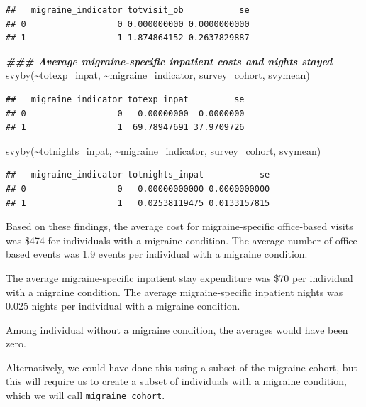 \documentclass[
]{book}
\newenvironment{Shaded}{\begin{snugshade}}{\end{snugshade}}
\newcommand{\DocumentationTok}[1]{\textcolor[rgb]{0.56,0.35,0.01}{\textbf{\textit{#1}}}}
\newcommand{\FunctionTok}[1]{\textcolor[rgb]{0.00,0.00,0.00}{#1}}
\newcommand{\NormalTok}[1]{#1}
\newcommand{\SpecialCharTok}[1]{\textcolor[rgb]{0.00,0.00,0.00}{#1}}
\begin{document}
\begin{verbatim}
##   migraine_indicator totvisit_ob           se
## 0                  0 0.000000000 0.0000000000
## 1                  1 1.874864152 0.2637829887
\end{verbatim}

\begin{Shaded}
\begin{Highlighting}[]
\DocumentationTok{\#\#\# Average migraine{-}specific inpatient costs and nights stayed}
\FunctionTok{svyby}\NormalTok{(}\SpecialCharTok{\textasciitilde{}}\NormalTok{totexp\_inpat, }\SpecialCharTok{\textasciitilde{}}\NormalTok{migraine\_indicator, survey\_cohort, svymean)}
\end{Highlighting}
\end{Shaded}

\begin{verbatim}
##   migraine_indicator totexp_inpat         se
## 0                  0   0.00000000  0.0000000
## 1                  1  69.78947691 37.9709726
\end{verbatim}

\begin{Shaded}
\begin{Highlighting}[]
\FunctionTok{svyby}\NormalTok{(}\SpecialCharTok{\textasciitilde{}}\NormalTok{totnights\_inpat, }\SpecialCharTok{\textasciitilde{}}\NormalTok{migraine\_indicator, survey\_cohort, svymean)}
\end{Highlighting}
\end{Shaded}

\begin{verbatim}
##   migraine_indicator totnights_inpat           se
## 0                  0   0.00000000000 0.0000000000
## 1                  1   0.02538119475 0.0133157815
\end{verbatim}

Based on these findings, the average cost for migraine-specific office-based visits was \$474 for individuals with a migraine condition. The average number of office-based events was 1.9 events per individual with a migraine condition.

The average migraine-specific inpatient stay expenditure was \$70 per individual with a migraine condition. The average migraine-specific inpatient nights was 0.025 nights per individual with a migraine condition.

Among individual without a migraine condition, the averages would have been zero.

Alternatively, we could have done this using a subset of the migraine cohort, but this will require us to create a subset of individuals with a migraine condition, which we will call \texttt{migraine\_cohort}.
\end{document}
